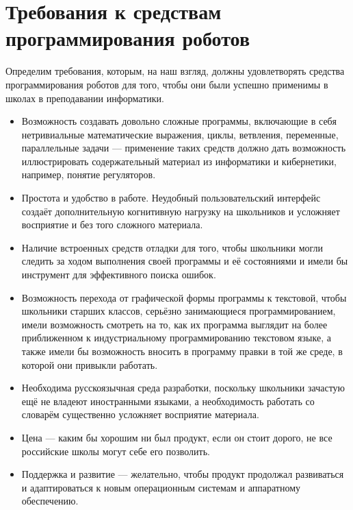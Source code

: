 \documentclass[a4paper]{article}
\begin{document}
\section{Требования к средствам программирования роботов}
Определим требования, которым, на наш взгляд, должны удовлетворять средства программирования роботов для того, чтобы они были успешно применимы в школах в преподавании информатики.
\begin{itemize}
  \item Возможность создавать довольно сложные программы, включающие в себя нетривиальные математические выражения, циклы, ветвления, переменные, параллельные задачи --- применение таких средств должно дать возможность иллюстрировать содержательный материал из информатики и кибернетики, например, понятие регуляторов.
  \item Простота и удобство в работе. Неудобный пользовательский интерфейс создаёт дополнительную когнитивную нагрузку на школьников и усложняет восприятие и без того сложного материала.
  \item Наличие встроенных средств отладки для того, чтобы школьники могли следить за ходом выполнения своей программы и её состояниями и имели бы инструмент для эффективного поиска ошибок.
  \item Возможность перехода от графической формы программы к текстовой, чтобы школьники старших классов, серьёзно занимающиеся программированием, имели возможность смотреть на то, как их программа выглядит на более приближенном к индустриальному программированию текстовом языке, а также имели бы возможность вносить в программу правки в той же среде, в которой они привыкли работать.
  \item Необходима русскоязычная среда разработки, поскольку школьники зачастую ещё не владеют иностранными языками, а необходимость работать со словарём существенно усложняет восприятие материала.
  \item Цена --- каким бы хорошим ни был продукт, если он стоит дорого, не все российские школы могут себе его позволить.
  \item Поддержка и развитие --- желательно, чтобы продукт продолжал развиваться и адаптироваться к новым операционным системам и аппаратному обеспечению.
\end{itemize}
\end{document}
